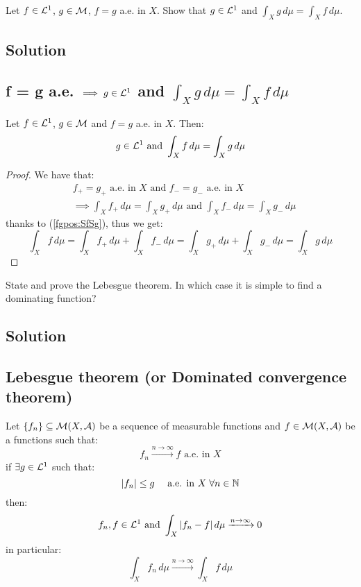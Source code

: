 
\question
Let $f \in \mathcal{L}^1$, $g \in \mathcal{M}$, $f = g$ a.e. in $X$. Show that $g \in \mathcal{L}^1$ and $\int_X g\, d\mu = \int_X f \, d\mu$.

\subsection*{Solution}

\subsection{f = g a.e. \texorpdfstring{$\implies g \in \mathcal{L}^1$}{then g is integrable} and \texorpdfstring{$\int_X g\, d\mu = \int_X f \, d\mu$}{its integral is the same as f}}
Let $f\in\mathcal{L}^1$, $g\in\mathcal{M}$ and $f=g$ a.e. in $X$. Then:
\[
    g \in \mathcal{L}^1 \text{ and } \int_X f \, d\mu = \int_X g \, d\mu
\]

\begin{proof}
    We have that:
    \begin{align*}
        & f_+=g_+ \text{ a.e. in } X  \text{ and } f_-=g_- \text{ a.e. in } X \\
        & \implies \int_X f_+ \, d\mu = \int_X g_+ \, d\mu \text{ and } \int_X f_- \, d\mu = \int_X g_- \, d\mu
    \end{align*}
    thanks to (\ref{fgpos:SfSg}), thus we get:
    \[
        \int_X f \, d\mu = \int_X f_+ \, d\mu + \int_X f_- \, d\mu = \int_X g_+ \, d\mu + \int_X g_- \, d\mu = \int_X g \, d\mu
    \]
\end{proof}


\question
State and prove the Lebesgue theorem. In which case it is simple to find a dominating function?


\subsection*{Solution}

\subsection{Lebesgue theorem (or Dominated convergence theorem)}\label{DCT}
Let $\{ f_n \}\subseteq \mathcal{M}(X,\mathcal{A})$ be a sequence of measurable functions and $f\in\mathcal{M}(X,\mathcal{A})$ be a functions such that:
\[
    f_n \xrightarrow{n\to\infty} f \text{ a.e. in } X
\]
if $\exists g \in \mathcal{L}^1$ such that:
\[
    |f_n| \leq g \quad \text{ a.e. in } X \; \forall n \in \mathbb{N}
\]
then:
\[
    f_n,f \in \mathcal{L}^1 \text{ and } \int_X |f_n-f| \, d\mu \xrightarrow{n\to\infty} 0    
\]
in particular:
\[
    \int_X f_n \, d\mu \xrightarrow{n\to\infty} \int_X f \, d\mu
\]


